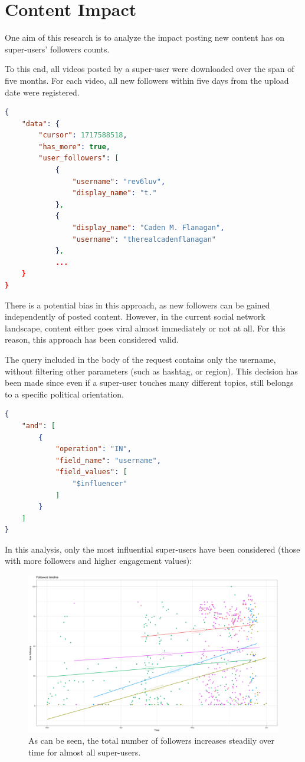 \section{Content Impact}

One aim of this research is to analyze the impact posting new content has on super-users' followers counts.

To this end, all videos posted by a super-user were downloaded over the span of five months. For each video, all new followers within five days from the upload date were registered.

\begin{lstlisting}[language=json]
{
    "data": {
        "cursor": 1717588518,
        "has_more": true,
        "user_followers": [
            {
                "username": "rev6luv",
                "display_name": "t."
            },
            {
                "display_name": "Caden M. Flanagan",
                "username": "therealcadenflanagan"
            },
            ...
    }
} 
\end{lstlisting}

There is a potential bias in this approach, as new followers can be gained independently of posted content. However, in the current social network landscape, content either goes viral almost immediately or not at all. For this reason, this approach has been considered valid.

The query included in the body of the request contains only the username, without filtering other parameters (such as hashtag, or region). This decision has been made since even if a super-user touches many different topics, still belongs to a specific political orientation.

\begin{lstlisting}[language=json, label={lst:query}]
{
    "and": [
        {
            "operation": "IN",
            "field_name": "username",
            "field_values": [
                "$influencer" 
            ]
        }
    ]
}
\end{lstlisting}

In this analysis, only the most influential super-users have been considered (those with more followers and higher engagement values):

\begin{figure}[H]
    \centering
    \includegraphics[width = .48\textwidth]{images/Final_Followers_Timeline.png}
    \caption*{As can be seen, the total number of followers increases steadily over time for almost all super-users.}
\end{figure}

